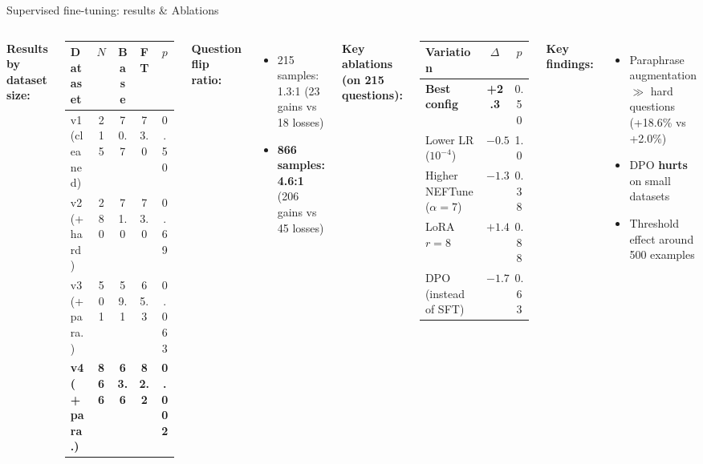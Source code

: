 \documentclass[aspectratio=169,10pt]{beamer}
\begin{document}
\begin{frame}{Supervised fine-tuning: results \& Ablations}
\begin{columns}[T]
\textbf{Results by dataset size:}
\vspace{0.3em}

\centering
\begin{tabular}{@{}lcccc@{}}
  \toprule
  \textbf{Dataset} & $N$ & Base & FT & $p$ \\
  \midrule
  v1 (cleaned) & 215 & 70.7 & 73.0 & 0.50 \\
  v2 (+hard)   & 280 & 71.0 & 73.0 & 0.69 \\
  v3 (+para.)  & 501 & 59.1 & 65.3 & 0.063 \\
  \textbf{v4 (+para.)} & \textbf{866} & \textbf{63.6} & \textbf{82.2} & \textbf{0.002} \\
  \bottomrule
\end{tabular}

\vspace{0.5em}
\textbf{Question flip ratio:}
\begin{itemize}\small
  \item 215 samples: 1.3:1 (23 gains vs 18 losses)
  \item \textbf{866 samples: 4.6:1} (206 gains vs 45 losses)
\end{itemize}

\textbf{Key ablations (on 215 questions):}
\vspace{0.3em}

\centering
\begin{tabular}{@{}lcc@{}}
  \toprule
  \textbf{Variation} & $\Delta$ & $p$ \\
  \midrule
  \textbf{Best config} & \textbf{+2.3} & 0.50 \\
  Lower LR ($10^{-4}$) & $-0.5$ & 1.0 \\
  Higher NEFTune ($\alpha\!=\!7$) & $-1.3$ & 0.38 \\
  LoRA $r\!=\!8$ & $+1.4$ & 0.88 \\
  DPO (instead of SFT) & $-1.7$ & 0.63 \\
  \bottomrule
\end{tabular}

\vspace{0.5em}
\textcolor{csblue}{\textbf{Key findings:}}
\begin{itemize}\small
  \item Paraphrase augmentation $\gg$ hard questions\\(+18.6\% vs +2.0\%)
  \item DPO \textbf{hurts} on small datasets
  \item Threshold effect around 500 examples
\end{itemize}
\end{columns}
\end{frame}
\end{document}
